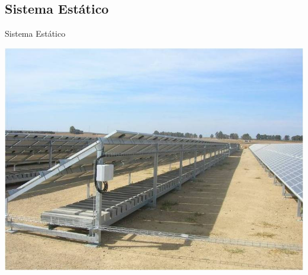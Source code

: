 \documentclass[xcolor={usenames,svgnames,dvipsnames}]{beamer}
\begin{document}
\subsection{Sistema Estático}
\label{sec:org0bbe959}

\begin{frame}[label={sec:org0b81b8d}]{Sistema Estático}
\begin{center}
\includegraphics[width=.9\linewidth]{../figs/EstructuraEstaticaSuelo.jpg}
\end{center}
\end{frame}
\end{document}
